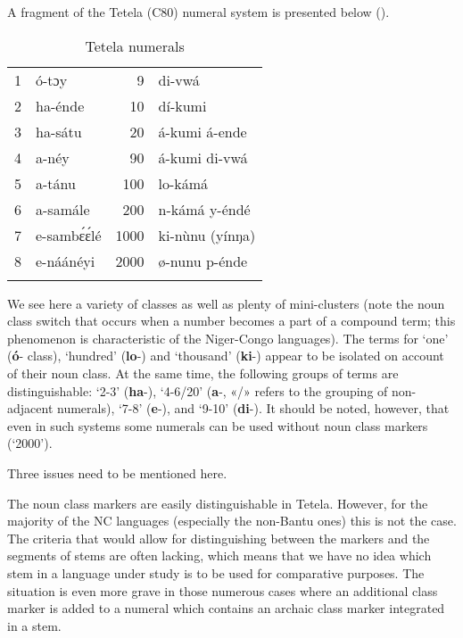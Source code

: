 A fragment of the Tetela (C80) numeral system is presented below ().


\begin{table}
\caption{Tetela numerals}
\label{tab:1:1}

\begin{tabularx}{\textwidth}{rXrX}
\lsptoprule

1 & ó-tɔy & 9 & di-vwá\\
2 & ha-{\'{e}}nde & 10 & dí-kumi\\
3 & ha-sátu & 20 & á-kumi á-ende\\
4 & a-n{\'{e}}y & 90 & á-kumi di-vwá\\
5 & a-tánu & 100 & lo-kámá\\
6 & a-samále & 200 & n-kámá y-{\'{e}}nd{\'{e}}\\
7 & e-samb{\'{ɛ}}{\'{ɛ}}l{\'{e}} & 1000 & ki-n{\`{u}}nu (yínŋa)\\
8 & e-náán{\'{e}}yi & 2000 & ø-nunu p-{\'{e}}nde\\
\lspbottomrule
\end{tabularx}
\end{table}

We see here a variety of classes as well as plenty of mini-clusters (note the noun class switch that occurs when a number becomes a part of a compound term; this phenomenon is characteristic of the Niger-Congo languages). The terms for ‘one’ (\textbf{ó}- class), ‘hundred’ (\textbf{lo}-) and ‘thousand’ (\textbf{ki}-) appear to be isolated on account of their noun class. At the same time, the following groups of terms are distinguishable: ‘2-3’ (\textbf{ha}-), ‘4-6/20’ (\textbf{a}-, «/» refers to the grouping of non-adjacent numerals), ‘7-8’ (\textbf{e}-), and ‘9-10’ (\textbf{di}-).  It should be noted, however, that even in such systems some numerals can be used without noun class markers (‘2000’). 

Three issues need to be mentioned here.

The noun class markers are easily distinguishable in Tetela. However, for the majority of the NC languages (especially the non-Bantu ones) this is not the case. The criteria that would allow for distinguishing between the markers and the segments of stems are often lacking, which means that we have no idea which stem in a language under study is to be used for comparative purposes. The situation is even more grave in those numerous cases where an additional class marker is added to a numeral which contains an archaic class marker integrated in a stem.

